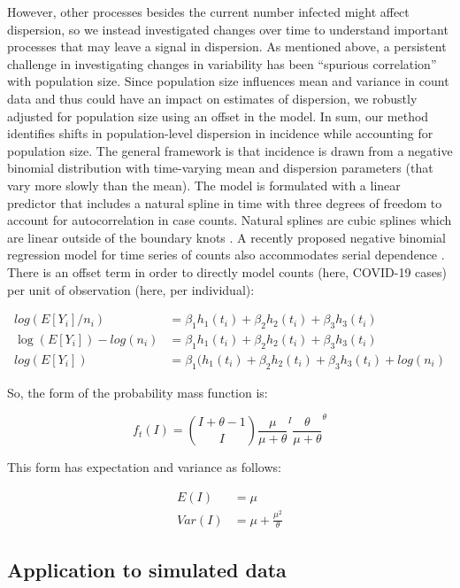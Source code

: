 \documentclass[10pt,letterpaper]{article}
\begin{document}
However, other processes besides the current number infected might affect dispersion, so we instead investigated changes over time to understand important processes that may leave a signal in dispersion. 
As mentioned above, a persistent challenge in investigating changes in variability has been ``spurious correlation'' with population size. 
Since population size influences mean and variance in count data and thus could have an impact on estimates of dispersion, we robustly adjusted for population size using an offset in the model. 
In sum, our method identifies shifts in population-level dispersion in incidence while accounting for population size. 
The general framework is that incidence is drawn from a negative binomial distribution with time-varying mean and dispersion parameters (that vary more slowly than the mean). 
The model is formulated with a linear predictor that includes a natural spline in time with three degrees of freedom to account for autocorrelation in case counts. 
Natural splines are cubic splines which are linear outside of the boundary knots \cite{perperoglou_review_2019}. 
A recently proposed negative binomial regression model for time series of counts also accommodates serial dependence \cite{davis_negative_2009}. 
There is an offset term in order to directly model counts (here, COVID-19 cases) per unit of observation (here, per individual):

\begin{align}
  log(E[Y_i]/n_i) &= \beta_1h_1(t_i) + \beta_2h_2(t_i) + \beta_3h_3(t_i) \\
  \log(E[Y_i])-log(n_i) &= \beta_1h_1(t_i) + \beta_2h_2(t_i) + \beta_3h_3(t_i) \\ 
  log(E[Y_i]) &= \beta_1(h_1(t_i) + \beta_2h_2(t_i) + \beta_3h_3(t_i) + log(n_i) 
\end{align}

So, the form of the probability mass function is:

\begin{equation}
  f_t(I) = \binom{I + \theta - 1}{I} \frac{\mu}{\mu+\theta}^I \frac{\theta}{\mu +\theta}^\theta
\end{equation}

This form has expectation and variance as follows:

\begin{align}
  E(I) &= \mu\\
  Var(I) &= \mu + \frac{\mu^2}{\theta}
\end{align}

\subsection*{Application to simulated data}
\end{document}
